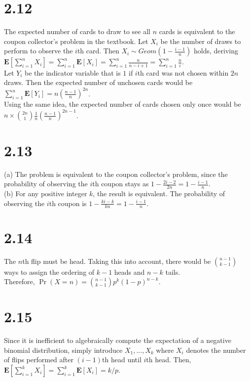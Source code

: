 \documentclass{article}
\begin{document}
\section*{2.12}
The expected number of cards to draw to see all $n$ cards is equivalent to the coupon collector's problem in the textbook.
Let $X_i$ be the number of draws to perform to observe the $i$th card.
Then $X_i\sim Geom(1-\frac{i-1}{n})$ holds, deriving $\textbf{E}[\sum\limits_{i=1}^nX_i]=\sum\limits_{i=1}^n\textbf{E}[X_i]=\sum\limits_{i=1}^n\frac{n}{n-i+1}=\sum\limits_{i=1}^n\frac{n}{i}$.\\
Let $Y_i$ be the indicator variable that is $1$ if $i$th card was not chosen within $2n$ draws.
Then the expected number of unchosen cards would be $\sum\limits_{i=1}^n\textbf{E}[Y_i]=n(\frac{n-1}{n})^{2n}$.\\
Using the same idea, the expected number of cards chosen only once would be $n\times\binom{2n}{1}\frac{1}{n}(\frac{n-1}{n})^{2n-1}$.
\section*{2.13}
(a) The problem is equivalent to the coupon collector's problem, since the probability of observing the $i$th coupon stays as $1-\frac{2i-2}{2n}=1-\frac{i-1}{n}$.\\
(b) For any positive integer $k$, the result is equivalent. The probability of observing the $i$th coupon is $1-\frac{ki-k}{kn}=1-\frac{i-1}{n}$.
\section*{2.14}
The $n$th flip must be head. Taking this into account, there would be $\binom{n-1}{k-1}$ ways to assign the ordering of $k-1$ heads and $n-k$ tails.\\
Therefore, $\Pr(X=n)=\binom{n-1}{k-1}p^k(1-p)^{n-k}$.
\section*{2.15}
Since it is inefficient to algebraically compute the expectation of a negative binomial distribution,
simply introduce $X_1,...,X_k$ where $X_i$ denotes the number of flips performed after $(i-1)$th head until $i$th head.
Then, $\textbf{E}[\sum\limits_{i=1}^kX_i]=\sum\limits_{i=1}^k\textbf{E}[X_i]=k/p$.
\end{document}
